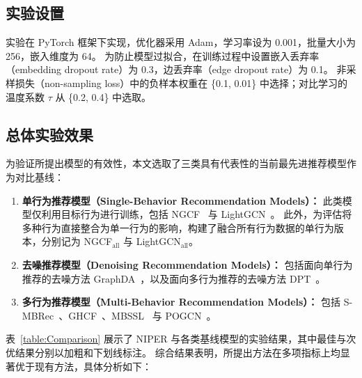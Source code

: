 \subsection{实验设置}
实验在 PyTorch 框架下实现，优化器采用 Adam，学习率设为 0.001，批量大小为 256，嵌入维度为 64。  
为防止模型过拟合，在训练过程中设置嵌入丢弃率（embedding dropout rate）为 0.3，边丢弃率（edge dropout rate）为 0.1。  
非采样损失（non-sampling loss）中的负样本权重在 \{0.1, 0.01\} 中选择；对比学习的温度系数 $\tau$ 从 \{0.2, 0.4\} 中选取。  

\subsection{总体实验效果}
为验证所提出模型的有效性，本文选取了三类具有代表性的当前最先进推荐模型作为对比基线：

\begin{enumerate}
    \item \textbf{单行为推荐模型（Single-Behavior Recommendation Models）：}  
    此类模型仅利用目标行为进行训练，包括 NGCF~\cite{wang2019NGCF} 与 LightGCN~\cite{he2020lightgcn}。  
    此外，为评估将多种行为直接整合为单一行为的影响，构建了融合所有行为数据的单行为版本，分别记为 NGCF$_{\text{all}}$ 与 LightGCN$_{\text{all}}$。

    \item \textbf{去噪推荐模型（Denoising Recommendation Models）：}  
    包括面向单行为推荐的去噪方法 GraphDA~\cite{fan2023graphDA}，以及面向多行为推荐的去噪方法 DPT~\cite{zhang2023DPT}。

    \item \textbf{多行为推荐模型（Multi-Behavior Recommendation Models）：}  
    包括 S-MBRec~\cite{gu2022S-MBRec}、GHCF~\cite{chen2021GHCF}、MBSSL~\cite{xu2023MBSSL} 与 POGCN~\cite{zhang2024POGCN}。
\end{enumerate}

表~\ref{table:Comparison} 展示了 NIPER 与各类基线模型的实验结果，其中最佳与次优结果分别以加粗和下划线标注。  
综合结果表明，所提出方法在多项指标上均显著优于现有方法，具体分析如下：

